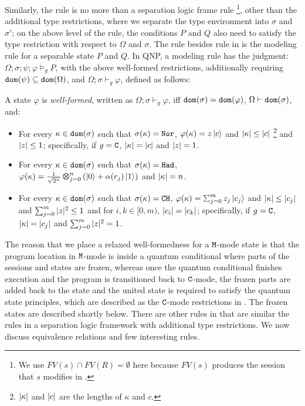 Similarly, the  rule is no more than a separation logic frame rule \footnote{We use $FV(s)\cap FV(R)=\emptyset$ here because $FV(s)$ produces the session that $s$ modifies in \qafny. }, other than the additional type restrictions, where we separate the type environment into $\sigma$ and $\sigma'$; on the above level of the  rule, the conditions $P$ and $Q$ also need to satisfy the type restriction with respect to $\Omega$ and $\sigma$.
The rule besides rule  in  is the modeling rule for a separable state $P$ and $Q$.
In QNP, a modeling rule has the judgment: $\Omega;\sigma;\psi;\varphi\models_g P$, with the above well-formed restrictions, additionally requiring $\mathtt{dom}(\psi) \subseteq \mathtt{dom}(\Omega)$, and $\Omega;\sigma\vdash_g \varphi$, defined as follows:

\begin{definition}\label{def:well-formed}\rm 
  A state $\varphi$ is \emph{well-formed}, written as
  $\Omega;\sigma \vdash_g \varphi$, iff $\mathtt{dom}(\sigma) = \mathtt{dom}(\varphi)$, $\Omega\vdash\mathtt{dom}(\sigma)$, and:
\begin{itemize}
\item For every $\kappa \in \mathtt{dom}(\sigma)$ such that $\sigma(\kappa) = \texttt{Nor}$, $\varphi(\kappa)=z\left\vert{c}\right\rangle$ and $|\kappa|\le |c|$ \footnote{$|\kappa|$ and $|c|$ are the lengths of $\kappa$ and $c$. } and $|z|\le 1$; specifically, if $g=\texttt{C}$,  $|\kappa| = |c|$ and $|z| = 1$.

\item For every $\kappa \in \mathtt{dom}(\sigma)$ such that $\sigma(\kappa) = \texttt{Had}$, $\varphi(\kappa)=\shad{2^n}{n}{\alpha(r_j)}$ and $|\kappa|=n$.

\item For every $\kappa \in \mathtt{dom}(\sigma)$ such that $\sigma(\kappa) = \texttt{CH}$, $\varphi(\kappa)=\sch{m}{z_j}{c_j}$ and $|\kappa|\le |c_j|$ and $\sum_{j=0}^m|z|^2\le 1$ and for $i,k\in [0,m)$, $|c_i|=|c_k|$;  specifically, if $g=\texttt{C}$,  $|\kappa| = |c_j|$ and $\sum_{j=0}^m|z|^2 = 1$.
\end{itemize}
\end{definition}

The reason that we place a relaxed well-formedness for a $\texttt{M}$-mode state is that the program location in $\texttt{M}$-mode is inside a quantum conditional where parts of the sessions and states are frozen, whereas once the quantum conditional finishes execution and the program is transitioned back to $\texttt{C}$-mode, the frozen parts are added back to the state and the united state is required to satisfy the quantum state principles, which are described as the $\texttt{C}$-mode restrictions in . The frozen states are described shortly below.
There are other rules in  that are similar the rules in a separation logic framework with additional \qafny type restrictions. We now discuss \qafny equivalence relations and few interesting rules.

